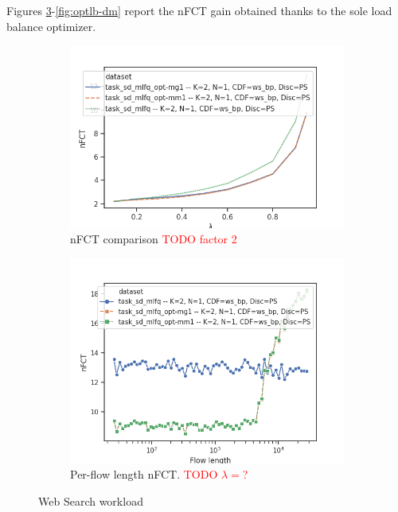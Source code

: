 Figures \ref{fig:optlb-ws}-\ref{fig:optlb-dm} report the nFCT gain obtained thanks to the sole load balance optimizer. 
\begin{figure}
	\centering
	\begin{subfigure}{.5\textwidth}
		\centering
		\includegraphics[width=1.05\textwidth]{Chapter3/Figures/ws_ps_comparison}
		\caption{nFCT comparison \textcolor{red}{TODO factor 2}}
		\label{fig:optlbgain-ws}
	\end{subfigure}%
	\begin{subfigure}{.5\textwidth}
		\centering
		\includegraphics[width=\textwidth]{Chapter3/Figures/ws_ps_detailed.png}
		\caption{Per-flow length nFCT. \textcolor{red}{TODO $\lambda=$?}}
		\label{fig:optlbgainvsflowsize-ws}
	\end{subfigure}%
	\caption{Web Search workload}
	\label{fig:optlb-ws}
\end{figure}%
